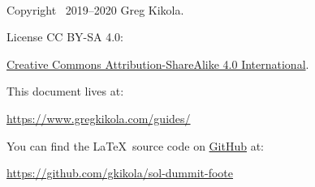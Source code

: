 \ \vspace{30mm}

\noindent Copyright \textcopyright\ 2019--2020 Greg Kikola.

\noindent License CC BY-SA 4.0:
\begin{center}
  \href{http://creativecommons.org/licenses/by-sa/4.0/}{Creative Commons
  Attribution-ShareAlike 4.0 International}.
\end{center}
\vspace{30mm}

\noindent This document lives at:
\begin{center}
  \href{https://www.gregkikola.com/guides/}
  {https://www.gregkikola.com/guides/}
\end{center}
You can find the \LaTeX\ source code on
\href{https://github.com/}{GitHub} at:
\begin{center}
  \href{https://github.com/gkikola/sol-dummit-foote}
  {https://github.com/gkikola/sol-dummit-foote}
\end{center}
